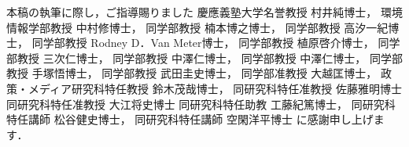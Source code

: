 \begin{acknowledgement}

本稿の執筆に際し，ご指導賜りました
慶應義塾大学名誉教授 村井純博士，
環境情報学部教授 中村修博士，
同学部教授 楠本博之博士，
同学部教授 高汐一紀博士，
同学部教授 Rodney D．Van Meter博士，
同学部教授 植原啓介博士，
同学部教授 三次仁博士，
同学部教授 中澤仁博士，
同学部教授 中澤仁博士，
同学部教授 手塚悟博士，
同学部教授 武田圭史博士，
同学部准教授 大越匡博士，
政策・メディア研究科特任教授 鈴木茂哉博士，
同研究科特任准教授 佐藤雅明博士
同研究科特任准教授 大江将史博士
同研究科特任助教 工藤紀篤博士，
同研究科特任講師 松谷健史博士，
同研究科特任講師 空閑洋平博士
に感謝申し上げます．

\end{acknowledgement}
